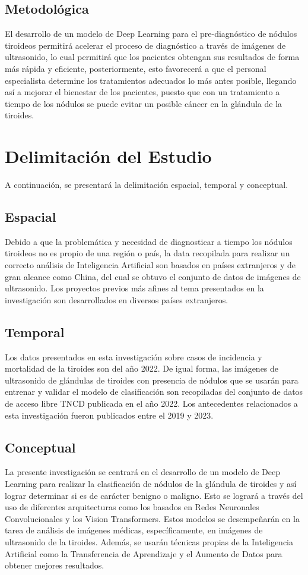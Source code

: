 \subsection{Metodológica}
El desarrollo de un modelo de Deep Learning para el pre-diagnóstico de nódulos tiroideos permitirá acelerar el proceso de diagnóstico a través de imágenes de ultrasonido, lo cual permitirá que los pacientes obtengan sus resultados de forma más rápida y eficiente, posteriormente, esto favorecerá a que el personal especialista determine los tratamientos adecuados lo más antes posible, llegando así a mejorar el bienestar de los pacientes, puesto que con un tratamiento a tiempo de los nódulos se puede evitar un posible cáncer en la glándula de la tiroides.

\section{Delimitación del Estudio}
A continuación, se presentará la delimitación espacial, temporal y conceptual.

\subsection{Espacial}
Debido a que la problemática y necesidad de diagnosticar a tiempo los nódulos tiroideos no es propio de una región o país, la data recopilada para realizar un correcto análisis de Inteligencia Artificial son basados en países extranjeros y de gran alcance como China, del cual se obtuvo el conjunto de datos de imágenes de ultrasonido. Los proyectos previos más afines al tema presentados en la investigación son desarrollados en diversos países extranjeros. 

\subsection{Temporal}
Los datos presentados en esta investigación sobre casos de incidencia y mortalidad de la tiroides son del año 2022. De igual forma, las imágenes de ultrasonido de glándulas de tiroides con presencia de nódulos que se usarán para entrenar y validar el modelo de clasificación son recopiladas del conjunto de datos de acceso libre TNCD publicada en el año 2022. Los antecedentes relacionados a esta investigación fueron publicados entre el 2019 y 2023.

\subsection{Conceptual}
La presente investigación se centrará en el desarrollo de un modelo de Deep Learning para realizar la clasificación de nódulos de la glándula de tiroides y así lograr determinar si es de carácter benigno o maligno. Esto se logrará a través del uso de diferentes arquitecturas como los basados en Redes Neuronales Convolucionales y los Vision Transformers. Estos modelos se desempeñarán en la tarea de análisis de imágenes médicas, específicamente, en imágenes de ultrasonido de la tiroides. Además, se usarán técnicas propias de la Inteligencia Artificial como la Transferencia de Aprendizaje y el Aumento de Datos para obtener mejores resultados. 
